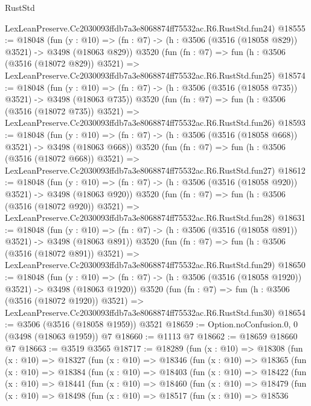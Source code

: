 \begin{lexlean}{RustStd}
\begin{coremodule}
    LexLeanPreserve.Cc2030093ffdb7a3e8068874ff75532ac.R6.RustStd.fun24)
@18555 := @18048
    (fun (y : @10) => (fn : @7) -> (h : @3506 (@3516 (@18058 @829)) @3521) -> @3498 (@18063 @829))
    @3520
    (fun (fn : @7) =>
    fun (h : @3506 (@3516 (@18072 @829)) @3521) =>
    LexLeanPreserve.Cc2030093ffdb7a3e8068874ff75532ac.R6.RustStd.fun25)
@18574 := @18048
    (fun (y : @10) => (fn : @7) -> (h : @3506 (@3516 (@18058 @735)) @3521) -> @3498 (@18063 @735))
    @3520
    (fun (fn : @7) =>
    fun (h : @3506 (@3516 (@18072 @735)) @3521) =>
    LexLeanPreserve.Cc2030093ffdb7a3e8068874ff75532ac.R6.RustStd.fun26)
@18593 := @18048
    (fun (y : @10) => (fn : @7) -> (h : @3506 (@3516 (@18058 @668)) @3521) -> @3498 (@18063 @668))
    @3520
    (fun (fn : @7) =>
    fun (h : @3506 (@3516 (@18072 @668)) @3521) =>
    LexLeanPreserve.Cc2030093ffdb7a3e8068874ff75532ac.R6.RustStd.fun27)
@18612 := @18048
    (fun (y : @10) => (fn : @7) -> (h : @3506 (@3516 (@18058 @920)) @3521) -> @3498 (@18063 @920))
    @3520
    (fun (fn : @7) =>
    fun (h : @3506 (@3516 (@18072 @920)) @3521) =>
    LexLeanPreserve.Cc2030093ffdb7a3e8068874ff75532ac.R6.RustStd.fun28)
@18631 := @18048
    (fun (y : @10) => (fn : @7) -> (h : @3506 (@3516 (@18058 @891)) @3521) -> @3498 (@18063 @891))
    @3520
    (fun (fn : @7) =>
    fun (h : @3506 (@3516 (@18072 @891)) @3521) =>
    LexLeanPreserve.Cc2030093ffdb7a3e8068874ff75532ac.R6.RustStd.fun29)
@18650 := @18048
    (fun (y : @10) => (fn : @7) -> (h : @3506 (@3516 (@18058 @1920)) @3521) -> @3498 (@18063 @1920))
    @3520
    (fun (fn : @7) =>
    fun (h : @3506 (@3516 (@18072 @1920)) @3521) =>
    LexLeanPreserve.Cc2030093ffdb7a3e8068874ff75532ac.R6.RustStd.fun30)
@18654 := @3506 (@3516 (@18058 @1959)) @3521
@18659 := Option.noConfusion.{0, 0} (@3498 (@18063 @1959)) @7
@18660 := @1113 @7
@18662 := @18659 @18660 @7
@18663 := @3519 @3565
@18717 := @18289
    (fun (x : @10) =>
    @18308
      (fun (x : @10) =>
      @18327
        (fun (x : @10) =>
        @18346
          (fun (x : @10) =>
          @18365
            (fun (x : @10) =>
            @18384
              (fun (x : @10) =>
              @18403
                (fun (x : @10) =>
                @18422
                  (fun (x : @10) =>
                  @18441
                    (fun (x : @10) =>
                    @18460
                      (fun (x : @10) =>
                      @18479
                        (fun (x : @10) =>
                        @18498
                          (fun (x : @10) =>
                          @18517
                            (fun (x : @10) =>
                            @18536

\end{coremodule}
\end{lexlean}
